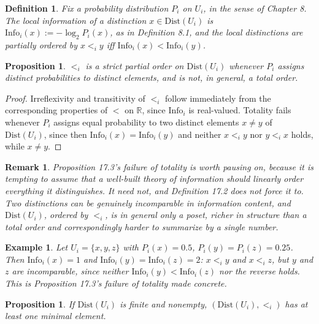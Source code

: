 \documentclass[11pt]{book}
\newtheorem{definition}[theorem]{Definition}
\newtheorem{proposition}[theorem]{Proposition}
\newtheorem{remark}[theorem]{Remark}
\newtheorem{example}[theorem]{Example}
\begin{document}
\begin{definition}
Fix a probability distribution $P_i$ on $U_i$, in the sense of Chapter 8. The \emph{local information} of a distinction $x \in \mathrm{Dist}(U_i)$ is $\mathrm{Info}_i(x) := -\log_2 P_i(x)$, as in Definition 8.1, and the local distinctions are partially ordered by $x <_i y$ iff $\mathrm{Info}_i(x) < \mathrm{Info}_i(y)$.
\end{definition}

\begin{proposition}
$<_i$ is a strict partial order on $\mathrm{Dist}(U_i)$ whenever $P_i$ assigns distinct probabilities to distinct elements, and is not, in general, a total order.
\end{proposition}

\begin{proof}
Irreflexivity and transitivity of $<_i$ follow immediately from the corresponding properties of $<$ on $\mathbb{R}$, since $\mathrm{Info}_i$ is real-valued. Totality fails whenever $P_i$ assigns equal probability to two distinct elements $x \neq y$ of $\mathrm{Dist}(U_i)$, since then $\mathrm{Info}_i(x) = \mathrm{Info}_i(y)$ and neither $x <_i y$ nor $y <_i x$ holds, while $x \neq y$.
\end{proof}

\begin{remark}
Proposition 17.3's failure of totality is worth pausing on, because it is tempting to assume that a well-built theory of information should linearly order everything it distinguishes. It need not, and Definition 17.2 does not force it to. Two distinctions can be genuinely incomparable in information content, and $\mathrm{Dist}(U_i)$, ordered by $<_i$, is in general only a poset, richer in structure than a total order and correspondingly harder to summarize by a single number.
\end{remark}

\begin{example}
Let $U_i = \{x,y,z\}$ with $P_i(x)=0.5$, $P_i(y)=P_i(z)=0.25$. Then $\mathrm{Info}_i(x)=1$ and $\mathrm{Info}_i(y)=\mathrm{Info}_i(z)=2$: $x <_i y$ and $x <_i z$, but $y$ and $z$ are incomparable, since neither $\mathrm{Info}_i(y) < \mathrm{Info}_i(z)$ nor the reverse holds. This is Proposition 17.3's failure of totality made concrete.
\end{example}

\begin{proposition}
If $\mathrm{Dist}(U_i)$ is finite and nonempty, $(\mathrm{Dist}(U_i), <_i)$ has at least one minimal element.
\end{proposition}
\end{document}
